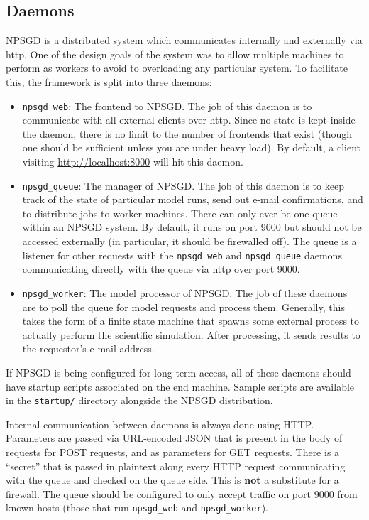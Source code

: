 \documentclass{article}
\newcommand{\mpath}[1]{\texttt{#1}}
\begin{document}
\subsection{Daemons}
NPSGD is a distributed system which communicates internally and externally via
http. One of the design goals of the system was to allow multiple machines to
perform as workers to avoid to overloading any particular system. To
facilitate this, the framework is split into three daemons:
\begin{itemize}
    \item \texttt{npsgd\_web}: The frontend to NPSGD. The job of this daemon is
    to communicate with all external clients over http. Since no state is kept
    inside the daemon, there is no limit to the number of frontends that exist (though one
    should be sufficient unless you are under heavy load). By default, a
    client visiting \url{http://localhost:8000} will hit this daemon.

    \item \texttt{npsgd\_queue}: The manager of NPSGD. The job of this daemon is
    to keep track of the state of particular model runs, send out e-mail
    confirmations, and to distribute jobs to worker machines. There can only
    ever be one queue within an NPSGD system. By default, it runs on port 9000
    but should not be accessed externally (in particular, it should be
    firewalled off). The queue is a listener for other requests with the 
    \texttt{npsgd\_web} and \texttt{npsgd\_queue} daemons communicating directly
    with the queue via http over port 9000.

    \item \texttt{npsgd\_worker}: The model processor of NPSGD. The job of these
    daemons are to poll the queue for model requests and process them.
    Generally, this takes the form of a finite state machine that spawns some
    external process to actually perform the scientific simulation. After
    processing, it sends results to the requestor's e-mail address.
\end{itemize}

If NPSGD is being configured for long term access, all of these daemons should
have startup scripts associated on the end machine. Sample scripts are available
in the \mpath{startup/} directory alongside the NPSGD distribution.

Internal communication between daemons is always done using HTTP. Parameters are passed via URL-encoded
JSON that is present in the body of requests for POST requests, and as parameters for GET requests.
There is a ``secret'' that is passed in plaintext along every HTTP request communicating with the queue and checked
on the queue side. This
is \textbf{not} a substitute for a firewall. The queue should be configured to only accept traffic
on port 9000 from known hosts (those that run \texttt{npsgd\_web} and \texttt{npsgd\_worker}).
\end{document}
